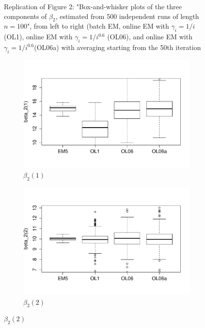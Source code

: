 \documentclass[12pt]{article}
\begin{document}
\begin{figure}[h!]
\begin{subfigure}[t]{.6\textwidth}
\end{subfigure}
\caption{Replication of Figure 2: "Box-and-whisker plots of the three components of $\beta_{2}$, estimated from 500 independent runs of length $n = 100$", from left to right (batch EM, online EM  with $\gamma_{i} = 1/i$ (OL1), online EM with $\gamma_{i} = 1/i^{0.6}$ (OL06), and online EM with $\gamma_{i} = 1/i^{0.6}$(OL06a) with averaging starting from the 50th iteration} \label{f2}
\end{figure}

\clearpage
\begin{figure}[h!]
\centering
\begin{subfigure}[t]{.6\textwidth}
\caption{$\beta_{2}(1)$}
\includegraphics[width = \textwidth]{fig3_beta1.PDF}
\end{subfigure}
\begin{subfigure}[t]{.6\textwidth}
\caption{$\beta_{2}(2)$}
\includegraphics[width = \textwidth]{fig3_beta2.PDF}

\end{subfigure}
\end{figure}
\end{document}
